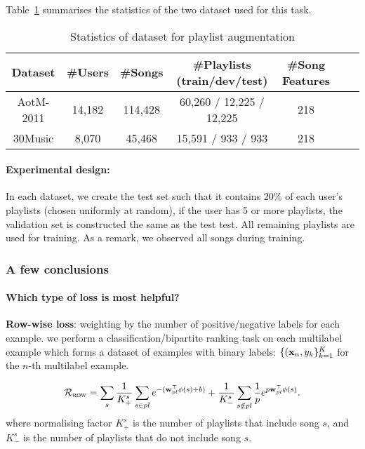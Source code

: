 Table~\ref{tab:stats_pla} summarises the statistics of the two dataset used for this task.

\begin{table}[!h]
\centering
\caption{Statistics of dataset for playlist augmentation}
\label{tab:stats_pla}
\begin{tabular}{ccccccc}
\toprule
Dataset & \#Users & \#Songs & \#Playlists (train/dev/test)  & \#Song Features \\
\midrule
AotM-2011 & 14,182 & 114,428 & 60,260 / 12,225 / 12,225 & 218 \\
30Music   & 8,070  & 45,468  & 15,591 / 933 / 933       & 218 \\
\bottomrule
\end{tabular}
\end{table}

\paragraph{Experimental design:}
In each dataset, we create the test set such that it contains 20\% of each user's playlists (chosen uniformly at random),
if the user has 5 or more playlists, the validation set is constructed the same as the test test.
All remaining playlists are used for training.
As a remark, we observed all songs during training.


\subsubsection{A few conclusions}

\paragraph{Which type of loss is most helpful?}

{\bf Row-wise loss}: weighting by the number of positive/negative labels for each example.
\ie we perform a classification/bipartite ranking task on each multilabel example 
which forms a dataset of examples with binary labels: $\{(\mathbf{x}_n, y_k\}_{k=1}^K$ for the $n$-th multilabel example.

\begin{equation*}
\mathcal{R}_\textsc{row} 
= \displaystyle \sum_s 
  \frac{1}{K_+^s} \sum_{s \in pl} e^{-(\mathbf{w}_{pl}^\top \phi(s) + b)} +
  \frac{1}{K_-^s} \sum_{s \notin pl} \frac{1}{p} e^{p \mathbf{w}_{pl}^\top \phi(s)}.
\end{equation*}
where normalising factor $K_+^s$ is the number of playlists that include song $s$,
and $K_-^s$ is the number of playlists that do not include song $s$.


